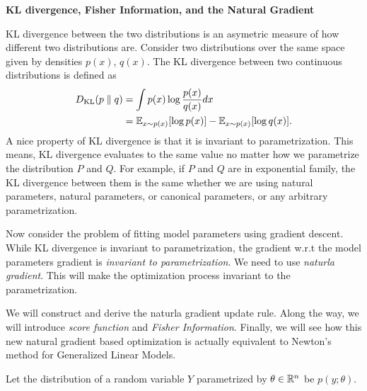 \documentclass[12pt,letterpaper,boxed]{hmcpset}
\newcommand{\DKL}[2]{D_{\mathrm{KL}}(#1 \parallel #2)}
\begin{document}
\begin{problem}[Problem 3]
  \textbf{KL divergence, Fisher Information, and the Natural Gradient}

  KL divergence between the two distributions is an asymetric measure of how different two distributions are. Consider two distributions over the same space given by densities $p(x)$, $q(x)$. The KL divergence between two continuous distributions is defined as
  \[
  \begin{aligned}
    \DKL{p}{q} &= \int p(x) \log \frac{p(x)}{q(x)} dx \\
    &= \E_{x \sim p(x)}[\log p(x)] - \E_{x \sim p(x)} [\log q(x)].
  \end{aligned}
  \]
  A nice property of KL divergence is that it is invariant to parametrization. This means, KL divergence evaluates to the same value no matter how we parametrize the distribution $P$ and $Q$. For example, if $P$ and $Q$ are in exponential family, the KL divergence between them is the same whether we are using natural parameters, natural parameters, or canonical parameters, or any arbitrary parametrization.

  Now consider the problem of fitting model parameters using gradient descent. While KL divergence is invariant to parametrization, the gradient w.r.t the model parameters gradient is \emph{invariant to parametrization}. We need to use \emph{naturla gradient}. This will make the optimization process invariant to the parametrization.

  We will construct and derive the naturla gradient update rule. Along the way, we will introduce \emph{score function} and \emph{Fisher Information}. Finally, we will see how this new natural gradient based optimization is actually equivalent to Newton's method for Generalized Linear Models.

  Let the distribution of a random variable $Y$ parametrized by $\theta \in \mathbb{R}^n$ be $p(y; \theta)$.
\end{problem}
\end{document}
